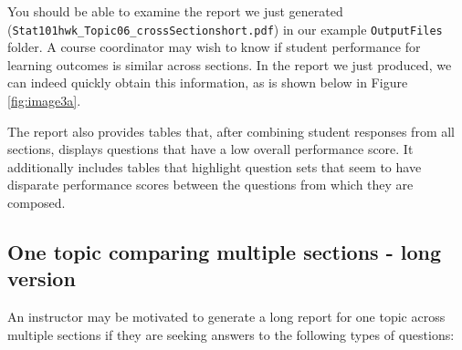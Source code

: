 \documentclass{article}\usepackage[]{graphicx}\usepackage[]{color}
\numberwithin{equation}{section} %
\begin{document}
You should be able to examine the report we just generated (\texttt{Stat101hwk\_Topic06\_crossSection\-short.pdf}) in our example \texttt{OutputFiles} folder. A course coordinator may wish to know if student performance for learning outcomes is similar across sections. In the report we just produced, we can indeed quickly obtain this information, as is shown below in Figure \ref{fig:image3a}.

\begin{center}
\captionsetup{width=0.6\textwidth}
\label{fig:image3a}
\end{center}

The report also provides tables that, after combining student responses from all sections, displays questions that have a low overall performance score. It additionally includes tables that highlight question sets that seem to have disparate performance scores between the questions from which they are composed.

\subsection{One topic comparing multiple sections - long version}

An instructor may be motivated to generate a long report for one topic across multiple sections if they are seeking answers to the following types of questions:
\end{document}
